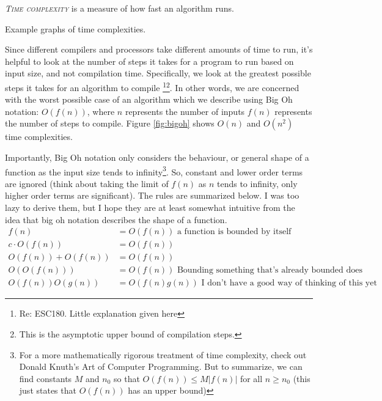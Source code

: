 \documentclass{tufte-handout}
\begin{document}
\noindent\textit{\textsc{Time complexity}} is a measure of how fast an algorithm runs.
\begin{marginfigure}
  \label{fig:bigoh}
\caption{Example graphs of time complexities.}
\end{marginfigure}
Since different compilers and processors take different amounts
of time to run, it's helpful to look at the number of steps it takes
for a program to run based on input size, and not compilation time.
Specifically, we look at the greatest possible steps it takes for an algorithm to compile \footnote{Re: ESC180. Little explanation given here}\footnote{This is the asymptotic upper bound of compilation steps.}. In other words, we are concerned with the worst possible case of an algorithm which we describe using Big Oh notation: $O(f(n))$, where $n$ represents the number of inputs $f(n)$ represents the number of steps to compile. Figure \ref{fig:bigoh} shows $O(n)$ and $O(n^2)$ time complexities.

Importantly, Big Oh notation only considers the behaviour, or general shape of a function as the input size tends to infinity\footnote{For a more mathematically rigorous treatment of time complexity, check out Donald Knuth's Art of Computer Programming. But to summarize, we can find constants $M$ and $n_0$ so that $O(f(n)) \leq M |f(n)|$ for all $n \geq n_0$ (this just states that $O(f(n))$ has an upper bound)}. So, constant and lower order terms are ignored (think about taking the limit of $f(n)$ as $n$ tends to infinity, only higher order terms are significant). The rules are summarized below. I was too lazy to derive them, but I hope they are at least somewhat intuitive from the idea that big oh notation describes the shape of a function.
\begin{align*}
  f(n) &= O(f(n)) \text{ a function is bounded by itself}\\
  c \cdot O(f(n)) &= O(f(n)) \\
  O(f(n)) + O(f(n)) &= O(f(n)) \\
  O(O(f(n))) &= O(f(n)) \text{ Bounding something that's already bounded does not change the bound}\\
  O(f(n))O(g(n)) &= O(f(n)g(n)) \text{ I don't have a good way of thinking of this yet}
\end{align*}
\end{document}
